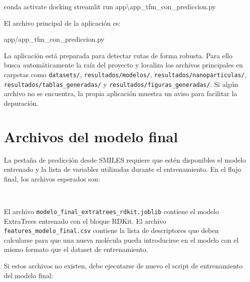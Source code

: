 \documentclass[
  spanish,
  a4paper,
  12pt,
  oneside,
  openany]{memoir}
\newenvironment{Shaded}{\begin{snugshade}}{\end{snugshade}}
\newcommand{\NormalTok}[1]{\textcolor[rgb]{0.00,0.23,0.31}{#1}}
\begin{document}
\begin{Shaded}
\begin{Highlighting}[]
\NormalTok{conda activate docking}
\NormalTok{streamlit run app\textbackslash{}app\_tfm\_con\_prediccion.py}
\end{Highlighting}
\end{Shaded}

El archivo principal de la aplicación es:

\begin{Shaded}
\begin{Highlighting}[]
\NormalTok{app/app\_tfm\_con\_prediccion.py}
\end{Highlighting}
\end{Shaded}

La aplicación está preparada para detectar rutas de forma robusta. Para
ello busca automáticamente la raíz del proyecto y localiza los archivos
principales en carpetas como \texttt{datasets/},
\texttt{resultados/modelos/}, \texttt{resultados/nanoparticulas/},
\texttt{resultados/tablas\_generadas/} y
\texttt{resultados/figuras\_generadas/}. Si algún archivo no se
encuentra, la propia aplicación muestra un aviso para facilitar la
depuración.

\section{Archivos del modelo final}

La pestaña de predicción desde SMILES requiere que estén disponibles el
modelo entrenado y la lista de variables utilizadas durante el
entrenamiento. En el flujo final, los archivos esperados son:

\begin{sloppypar}
\footnotesize
\noindent{}\\[0.10cm]
\end{sloppypar}

El archivo \texttt{modelo\_final\_extratrees\_rdkit.joblib} contiene el
modelo ExtraTrees entrenado con el bloque RDKit. El archivo
\texttt{features\_modelo\_final.csv} contiene la lista de descriptores
que deben calcularse para que una nueva molécula pueda introducirse en
el modelo con el mismo formato que el dataset de entrenamiento.

Si estos archivos no existen, debe ejecutarse de nuevo el script de
entrenamiento del modelo final:
\end{document}
